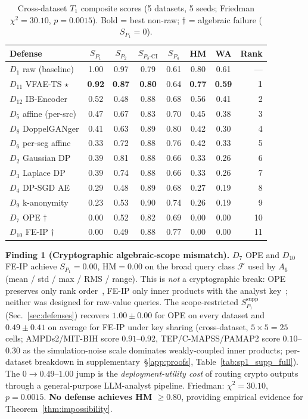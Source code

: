 \documentclass{article}
\theoremstyle{remark}
\newcommand{\SCI}{S_{P_3\text{-CI}}}
\begin{document}
\begin{table}[h]
\centering
\caption{Cross-dataset $T_1$ composite scores (5 datasets, 5 seeds; Friedman $\chi^2=30.10$, $p=0.0015$). Bold = best non-raw; $\dagger$ = algebraic failure ($S_{P_1}=0$).}
\label{tab:composite}
\small
\setlength{\tabcolsep}{4pt}
\begin{tabular}{@{}lccccccr@{}}
\toprule
Defense & $S_{P_1}$ & $S_{P_2}$ & $\SCI$ & $S_{P_4}$ & \textbf{HM} & \textbf{WA} & Rank \\
\midrule
$D_1$ raw (baseline)       & 1.00 & 0.97 & 0.79 & 0.61 & 0.80 & 0.61 & --- \\
$D_{11}$ VFAE-TS $\star$   & \textbf{0.92} & \textbf{0.87} & \textbf{0.80} & 0.64 & \textbf{0.77} & \textbf{0.59} & \textbf{1} \\
$D_{12}$ IB-Encoder        & 0.52 & 0.48 & 0.88 & 0.68 & 0.56 & 0.41 & 2 \\
$D_5$ affine (per-src)     & 0.47 & 0.67 & 0.83 & 0.70 & 0.45 & 0.38 & 3 \\
$D_8$ DoppelGANger         & 0.41 & 0.63 & 0.89 & 0.80 & 0.42 & 0.30 & 4 \\
$D_6$ per-seg affine       & 0.33 & 0.72 & 0.88 & 0.76 & 0.42 & 0.33 & 5 \\
$D_2$ Gaussian DP          & 0.39 & 0.81 & 0.88 & 0.66 & 0.33 & 0.26 & 6 \\
$D_3$ Laplace DP           & 0.39 & 0.74 & 0.88 & 0.66 & 0.33 & 0.26 & 7 \\
$D_4$ DP-SGD AE            & 0.29 & 0.48 & 0.89 & 0.68 & 0.27 & 0.19 & 8 \\
$D_9$ k-anonymity          & 0.23 & 0.53 & 0.90 & 0.74 & 0.26 & 0.19 & 9 \\
$D_7$ OPE $\dagger$        & 0.00 & 0.52 & 0.82 & 0.69 & 0.00 & 0.00 & 10 \\
$D_{10}$ FE-IP $\dagger$   & 0.00 & 0.49 & 0.88 & 0.77 & 0.00 & 0.00 & 11 \\
\bottomrule
\end{tabular}
\end{table}

\textbf{Finding 1 (Cryptographic algebraic-scope mismatch).} $D_7$ OPE and $D_{10}$ FE-IP achieve $S_{P_1} = 0.00$, $\mathrm{HM} = 0.00$ on the broad query class $\mathcal{F}$ used by $A_6$ (mean / std / max / RMS / range). This is \emph{not} a cryptographic break: OPE preserves only rank order~\cite{boldyreva2009}, FE-IP only inner products with the analyst key~\cite{abdalla2015}; neither was designed for raw-value queries. The scope-restricted $S_{P_1}^{\text{supp}}$ (Sec.~\ref{sec:defenses}) recovers $\mathbf{1.00 \pm 0.00}$ for OPE on every dataset and $\mathbf{0.49 \pm 0.41}$ on average for FE-IP under key sharing (cross-dataset, $5 \times 5 = 25$ cells; AMPDs2/MIT-BIH score $0.91$--$0.92$, TEP/C-MAPSS/PAMAP2 score $0.10$--$0.30$ as the simulation-noise scale dominates weakly-coupled inner products; per-dataset breakdown in supplementary~\S\ref{app:proofs}, Table~\ref{tab:sp1_supp_full}). The $0 \to 0.49$--$1.00$ jump is the \emph{deployment-utility cost} of routing crypto outputs through a general-purpose LLM-analyst pipeline. Friedman: $\chi^2 = 30.10$, $p = 0.0015$. \textbf{No defense achieves HM $\ge 0.80$}, providing empirical evidence for Theorem~\ref{thm:impossibility}.
\end{document}
